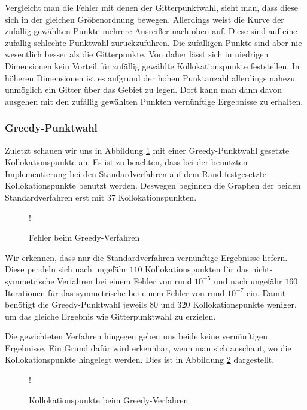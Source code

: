 Vergleicht man die Fehler mit denen der Gitterpunktwahl, sieht man, dass diese sich in der gleichen Größenordnung bewegen. Allerdings weist die Kurve der zufällig gewählten Punkte mehrere Ausreißer nach oben auf. Diese sind auf eine zufällig schlechte Punktwahl zurückzuführen. Die zufälligen Punkte sind aber nie wesentlich besser als die Gitterpunkte. Von daher lässt sich in niedrigen Dimensionen kein Vorteil für zufällig gewählte Kollokationspunkte feststellen. In höheren Dimensionen ist es aufgrund der hohen Punktanzahl allerdings nahezu unmöglich ein Gitter über das Gebiet zu legen. Dort kann man dann davon ausgehen mit den zufällig gewählten Punkten vernünftige Ergebnisse zu erhalten.

\subsubsection{Greedy-Punktwahl}
Zuletzt schauen wir uns in Abbildung \ref{fig:error-greedy} mit einer Greedy-Punktwahl gesetzte Kollokationspunkte an. Es ist zu beachten, dass bei der benutzten Implementierung bei den Standardverfahren auf dem Rand festgesetzte Kollokationspunkte benutzt werden. Deswegen beginnen die Graphen der beiden Standardverfahren erst mit $37$ Kollokationspunkten.
\begin{figure}[ht]
\centering
\resizebox {\columnwidth} {!} {

}
\caption{Fehler beim Greedy-Verfahren}
\label{fig:error-greedy}
\end{figure}

Wir erkennen, dass nur die Standardverfahren vernünftige Ergebnisse liefern. Diese pendeln sich nach ungefähr $110$ Kollokationspunkten für das nicht-symmetrische Verfahren bei einem Fehler von rund $10^{-5}$ und nach ungefähr $160$ Iterationen für das symmetrische bei einem Fehler von rund $10^{-7}$ ein. Damit benötigt die Greedy-Punktwahl jeweils $80$ und $320$ Kollokationspunkte weniger, um das gleiche Ergebnis wie Gitterpunktwahl zu erzielen.

Die gewichteten Verfahren hingegen geben uns beide keine vernünftigen Ergebnisse. Ein Grund dafür wird erkennbar, wenn man sich anschaut, wo die Kollokationspunkte hingelegt werden. Dies ist in Abbildung \ref{fig:greedy-points} dargestellt.
\begin{figure}[ht]
\centering
\resizebox {\columnwidth} {!} {

}
\caption{Kollokationspunkte beim Greedy-Verfahren}
\label{fig:greedy-points}
\end{figure}

